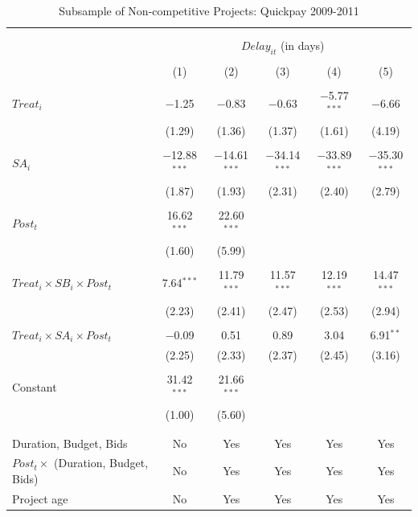 \documentclass[
]{article}
\begin{document}
\begin{table}[H] \centering 
  \caption{Subsample of Non-competitive Projects: Quickpay 2009-2011} 
  \label{} 
\small 
\begin{tabular}{@{\extracolsep{-2pt}}lccccc} 
\\[-1.8ex]\hline 
\hline \\[-1.8ex] 
\\[-1.8ex] & \multicolumn{5}{c}{$Delay_{it}$ (in days)} \\ 
\\[-1.8ex] & (1) & (2) & (3) & (4) & (5)\\ 
\hline \\[-1.8ex] 
 $Treat_i$ & $-$1.25 & $-$0.83 & $-$0.63 & $-$5.77$^{***}$ & $-$6.66 \\ 
  & (1.29) & (1.36) & (1.37) & (1.61) & (4.19) \\ 
  & & & & & \\ 
 $SA_i$ & $-$12.88$^{***}$ & $-$14.61$^{***}$ & $-$34.14$^{***}$ & $-$33.89$^{***}$ & $-$35.30$^{***}$ \\ 
  & (1.87) & (1.93) & (2.31) & (2.40) & (2.79) \\ 
  & & & & & \\ 
 $Post_t$ & 16.62$^{***}$ & 22.60$^{***}$ &  &  &  \\ 
  & (1.60) & (5.99) &  &  &  \\ 
  & & & & & \\ 
 $Treat_i \times SB_i \times Post_t$ & 7.64$^{***}$ & 11.79$^{***}$ & 11.57$^{***}$ & 12.19$^{***}$ & 14.47$^{***}$ \\ 
  & (2.23) & (2.41) & (2.47) & (2.53) & (2.94) \\ 
  & & & & & \\ 
 $Treat_i \times SA_i \times Post_t$ & $-$0.09 & 0.51 & 0.89 & 3.04 & 6.91$^{**}$ \\ 
  & (2.25) & (2.33) & (2.37) & (2.45) & (3.16) \\ 
  & & & & & \\ 
 Constant & 31.42$^{***}$ & 21.66$^{***}$ &  &  &  \\ 
  & (1.00) & (5.60) &  &  &  \\ 
  & & & & & \\ 
\hline \\[-1.8ex] 
Duration, Budget, Bids & No & Yes & Yes & Yes & Yes \\ 
$Post_t \times $  (Duration, Budget, Bids) & No & Yes & Yes & Yes & Yes \\ 
Project age & No & Yes & Yes & Yes & Yes \\ 

\end{tabular}
\end{table}
\end{document}
